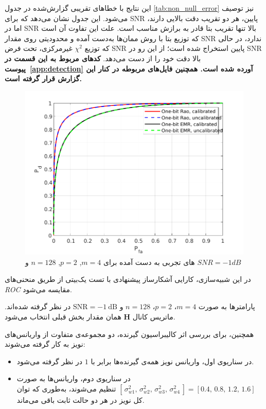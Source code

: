 این نتایج با خطاهای تقریبی گزارش‌شده در جدول \ref{tab:non_null_error} نیز توصیف می‌شود.
این جدول نشان می‌دهد که برای SNR پایین، هر دو تقریب دقت بالایی دارند، 
اما در SNR بالا تنها تقریب بتا قادر به برازش مناسب است.  
علت این تفاوت آن است که توزیع بتا با روش ممان‌ها  به‌دست آمده و محدودیتی روی مقدار SNR ندارد، 
در حالی که توزیع $\chi^{2}$ غیرمرکزی، تحت فرض SNR پایین استخراج شده است؛
از این رو در SNR بالا دقت خود را از دست می‌دهد.
\linebreak
\textbf{
	کدهای مربوط به این قسمت در  پیوست~\ref{app:detection} آورده شده است. همچنین فایل‌های مربوطه در کنار این گزارش قرار گرفته است.
}


\begin{figure}[!b]
	\centering
	\includegraphics[width=0.8\linewidth]{figs/roc}
	\caption[
	های تجربی
	]{
		های تجربی به دست آمده برای
		$m=4$, $p=2$, $n=128$ و
		$SNR=-1dB$
	}
	\label{fig:ROC}
\end{figure} 

در این شبیه‌سازی، کارایی آشکارساز پیشنهادی با تست  یک‌بیتی از طریق منحنی‌های \emph{ROC} مقایسه می‌شود.  

پارامترها به صورت $m=4$، $p=2$، $n=128$ و $\mathrm{SNR}=-1~\mathrm{dB}$ در نظر گرفته شده‌اند.  
ماتریس کانال $\mathbf{H}$ همان مقدار بخش قبلی انتخاب می‌شود.  

همچنین، برای بررسی اثر کالیبراسیون گیرنده، دو مجموعه‌ی متفاوت از واریانس‌های نویز به کار گرفته می‌شوند:  
\begin{itemize}
	\item در سناریوی اول، واریانس نویز همه‌ی گیرنده‌ها برابر با $1$ در نظر گرفته می‌شود.  
	\item در سناریوی دوم، واریانس‌ها به صورت 
	\([\,\sigma_{w1}^{2},\,\sigma_{w2}^{2},\,\sigma_{w3}^{2},\,\sigma_{w4}^{2}\,] 
	= [0.4,\,0.8,\,1.2,\,1.6]\) تنظیم می‌شوند،  
	به‌طوری که توان کل نویز در هر دو حالت ثابت باقی می‌ماند.  
\end{itemize}

